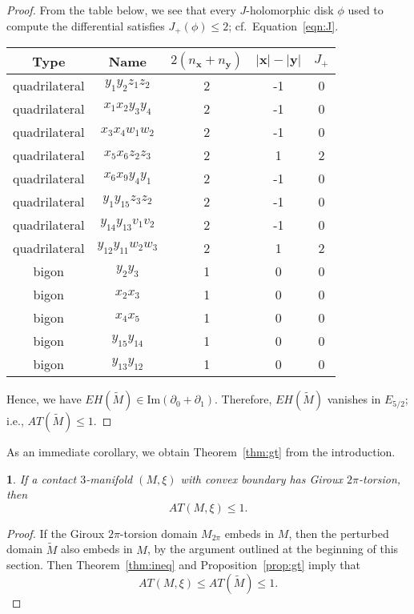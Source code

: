 \documentclass[11pt,oneside,english]{amsart}
\providecommand{\tabularnewline}{\\}
\numberwithin{equation}{section}
\numberwithin{figure}{section}
\theoremstyle{definition}
\theoremstyle{plain}
\theoremstyle{plain}
\theoremstyle{remark}
\theoremstyle{plain}
\newtheorem{cor}[thm]{\protect\corollaryname}
\providecommand{\corollaryname}{Corollary}
\begin{document}
\begin{proof}
From the table below, we see that every $J$-holomorphic disk $\phi$ used
to compute the differential satisfies $J_{+}(\phi) \le 2$; cf.~Equation~\ref{eqn:J}. 

\begin{center}
\begin{tabular}{|c|c|c|c|c|}
\hline
Type & Name & $2(n_{\mathbf{x}}+n_{\mathbf{y}})$ & $|\mathbf{x}|-|\mathbf{y}|$ & $J_{+}$\tabularnewline
\hline
\hline
quadrilateral & $y_{1}y_{2}z_{1}z_{2}$ & 2 & -1 & 0\tabularnewline
\hline
quadrilateral & $x_{1}x_{2}y_{3}y_{4}$ & 2 & -1 & 0\tabularnewline
\hline
quadrilateral & $x_{3}x_{4}w_{1}w_{2}$ & 2 & -1 & 0\tabularnewline
\hline
quadrilateral & $x_{5}x_{6}z_{2}z_{3}$ & 2 & 1 & 2\tabularnewline
\hline
quadrilateral & $x_6 x_9 y_4 y_1$ & 2 & -1 & 0 \tabularnewline
\hline
quadrilateral & $y_1 y_{15} z_3 z_2$ & 2 & -1 & 0 \tabularnewline
\hline
quadrilateral & $y_{14} y_{13} v_1 v_2$ & 2 & -1 & 0 \tabularnewline
\hline
quadrilateral & $y_{12} y_{11} w_2 w_3$ & 2 & 1 & 2 \tabularnewline
\hline
bigon & $y_{2}y_{3}$ & 1 & 0 & 0\tabularnewline
\hline
bigon & $x_{2}x_{3}$ & 1 & 0 & 0\tabularnewline
\hline
bigon & $x_{4}x_{5}$ & 1 & 0 & 0\tabularnewline
\hline
bigon & $y_{15}y_{14}$ & 1 & 0 & 0\tabularnewline
\hline
bigon & $y_{13}y_{12}$ & 1 & 0 & 0\tabularnewline
\hline
\end{tabular}
\par\end{center}

Hence, we have
${\mathit{EH}}(\widetilde{M})\in \mbox{Im}(\partial_{0}+\partial_{1})$. Therefore,
${\mathit{EH}}(\widetilde{M})$ vanishes in $E_{5/2}$; i.e., ${\mathit{AT}}(\widetilde{M})\le 1$.
\end{proof}

As an immediate corollary, we obtain Theorem~\ref{thm:gt} from the introduction.

\begin{cor}
If a contact $3$-manifold $(M,\xi)$ with convex boundary has Giroux $2\pi$-torsion,
then
\[
{\mathit{AT}}(M,\xi) \le 1.
\]
\end{cor}

\begin{proof}
If the Giroux $2\pi$-torsion domain $M_{2\pi}$ embeds in $M$, then
the perturbed domain $\widetilde{M}$ also embeds in $M$, by the
argument outlined at the beginning of this section. Then Theorem~\ref{thm:ineq}
and Proposition~\ref{prop:gt} imply that
\[
{\mathit{AT}}(M,\xi)\le {\mathit{AT}}(\widetilde{M}) \le 1.
\]
\end{proof}
\end{document}
